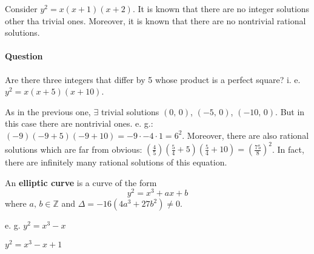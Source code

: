 Consider $y^2=x\left(x+1\right)\left(x+2\right)$. It is known that
there are no integer solutions other tha trivial ones.
Moreover, it is known that there are no nontrivial rational solutions.

\paragraph{Question} Are there three integers that differ by 5 whose
product is a perfect square? i. e. $y^2=x\left(x+5\right)\left(x+10\right)$.

As in the previous one, $\exists$ trivial solutions $\left( 0,\,0 \right)$,
$\left( -5,\,0 \right)$, $\left( -10,\,0 \right)$. But in this case there are
nontrivial ones. e. g.:
$\left(-9\right)\left(-9+5\right)\left(-9+10\right)=-9\cdot-4\cdot 1=6^2$.
Moreover, there are also rational solutions which are far from obvious:
$\left(\frac{4}{5}\right)\left(\frac{5}{4}+5\right)\left(\frac{5}{4}+10\right)=\left(\frac{75}{8}\right)^2$.
In fact, there are infinitely many rational solutions of this equation.

\begin{definition}
    An \textbf{elliptic curve} is a curve of the form
    \[y^2=x^3+ax+b\]
    where $a,\,b\in\mathbb{Z}$ and $\Delta=-16\left(4a^3+27b^2\right)\neq 0$.
\end{definition}

e. g. $y^2=x^3-x$

\begin{center}
\end{center}

$y^2=x^3-x+1$

\begin{center}
\end{center}